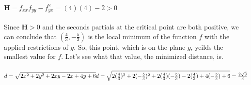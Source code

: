 \documentclass[12pt]{article}
\begin{document}
\noindent $\mathbf{H} = f_{xx}f_{yy} - f_{yx}^{2} = (4)(4) - 2 > 0$\\\\
\noindent Since $\mathbf{H} > 0$ and the seconds partials at the critical point are both positive, we can conclude that $(\frac{4}{3}, -\frac{5}{3})$
is the local minimum of the function $f$ with the applied restrictions of $g$. So, this point, which is on the plane $g$, yeilds the smallest value for $f$.
Let's see what that value, the minimized distance, is.\\\\
\noindent  $d = \sqrt{2x^{2}+2y^{2}+2xy-2x+4y+6} 
\\ d =\sqrt{2(\frac{4}{3})^{2}+2(-\frac{5}{3})^{2}+2(\frac{4}{3})(-\frac{5}{3})-2(\frac{4}{3})+4(-\frac{5}{3})+6} = \frac{2\sqrt{3}}{3}$\\\\
\end{document}
